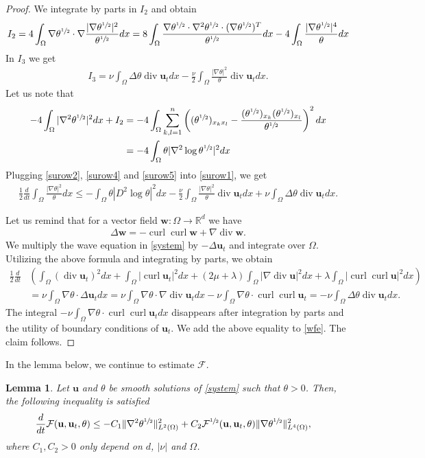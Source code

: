 \documentclass[11pt]{article}
\numberwithin{equation}{section}
\theoremstyle{plain}
\newtheorem{lem}[defi]{Lemma}
\newcommand\bb[1]{\mathbf{#1}}
\newcommand{\rn}{\mathbb{R}^d}
\newcommand{\io}{\int_{\Omega}}
\newcommand{\ld}{L^2(\Omega)}
\newcommand{\ul}{\frac{1}{2}}
\newcommand{\sul}{\sfrac{1}{2}}
\newcommand{\ddt}{\frac{d}{dt}}
\renewcommand{\div}{\operatorname{div}}
\DeclareMathOperator{\curl}{curl}
\newcommand{\F}{\mathcal{F}}
\newcommand{\wspnd}{2\mu+\lambda}
\newcommand{\bu}{\bb{u}}
\begin{document}
\begin{proof}
We integrate by parts in $I_2$ and obtain
\begin{align*}
I_2=4\io\nabla\theta^{\sul}\cdot\nabla\frac{|\nabla\theta^{\sul}|^2}{\theta^{\sul}}dx=8\io\frac{\nabla\theta^{\sul} \cdot \nabla^2\theta^{\sul}\cdot(\nabla\theta^{\sul})^T}{\theta^{\sul}}dx-4\io\frac{|\nabla\theta^{\sul}|^4}{\theta}dx
\end{align*}
In $I_3$ we get
\begin{align}\label{surow4}
I_3=\nu\io\Delta\theta\div \bu_tdx-\frac{\nu}2\io\frac{|\nabla\theta|^2}{\theta}\div \bu_t dx.
\end{align}
Let us note that
\begin{align}\label{surow5}
-4\io|\nabla^2\theta^{\sul}|^2dx+I_2&=-4\io\sum_{k,l=1}^n\left((\theta^{\sul})_{x_kx_l}-\frac{(\theta^{\sul})_{x_k}(\theta^{\sul})_{x_l}}{\theta^{\sul}}\right)^2dx\nonumber\\
&=-4\io\theta|\nabla^2\log\theta^{\sul}|^2dx
\end{align}
Plugging \eqref{surow2}, \eqref{surow4} and \eqref{surow5} into \eqref{surow1}, we get
\begin{align}\label{wfe}
\ul\ddt\io\frac{|\nabla\theta|^2}{\theta}dx\leq-\io\theta|D^2\log\theta|^2dx-\frac\nu2\io\frac{|\nabla\theta|^2}\theta\div \bu_tdx+\nu\io\Delta\theta\div \bu_tdx.
\end{align}

Let us remind that for a vector field $\bb w\colon\Omega\to\rn$ we have
\begin{align}\label{identity}
\Delta \bb w=-\curl\curl \bb w+\nabla\div \bb w.
\end{align}
We multiply the wave equation in \eqref{system} by $-\Delta \bu_t$ and integrate over $\Omega$. Utilizing the above formula and integrating by parts, we obtain
\begin{align*}
\ul\ddt&\left(\io(\div \bu_t)^2dx+\io|\curl \bu_t|^2dx+(\wspnd)\io|\nabla\div\bu|^2dx+\lambda\io|\curl\curl\bu|^2dx\right)\\
&=\nu\io\nabla\theta\cdot\Delta \bu_t dx=\nu\io\nabla\theta\cdot\nabla\div \bu_t dx-\nu\io\nabla\theta\cdot\curl\curl\bu_t=-\nu\io\Delta\theta\div\bu_tdx.
\end{align*}
The integral $-\nu\io\nabla\theta\cdot\curl\curl\bu_tdx$ disappears after integration by parts and the utility of boundary conditions of $\bb u_t$. We add the above equality to \eqref{wfe}. The claim follows.
\end{proof}
In the lemma below, we continue to estimate $\F$.
\begin{lem}
Let $\bu$ and $\theta$ be smooth solutions of \eqref{system} such that $\theta>0$. Then, the following inequality is satisfied
\begin{align}\label{Ffestin}
\ddt\F(\bb u,\bu_t, \theta) &\leq -C_1 \|\nabla^2\theta^{\sul}\|_{\ld}^2 + C_2 \F^{\sul}(\bb u,\bu_t, \theta) \|\nabla \theta^{\sul}\|_{L^4(\Omega)}^2,
\end{align}
where $C_1, C_2 > 0$ only depend on $d$, $|\nu|$ and $\Omega$.
\end{lem}
\end{document}
